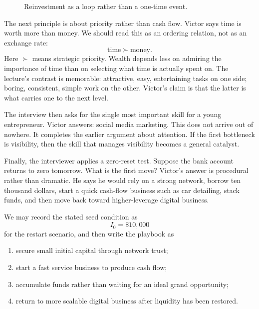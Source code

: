 \begin{figure}
\centering
{}
\caption{Reinvestment as a loop rather than a one-time event.}
\end{figure}

The next principle is about priority rather than cash flow. Victor says time is worth more than money. We should read this as an ordering relation, not as an exchange rate:
\begin{equation}
\text{time} \succ \text{money}.
\end{equation}
Here \(\succ\) means strategic priority. Wealth depends less on admiring the importance of time than on selecting what time is actually spent on. The lecture's contrast is memorable: attractive, easy, entertaining tasks on one side; boring, consistent, simple work on the other. Victor's claim is that the latter is what carries one to the next level.

The interview then asks for the single most important skill for a young entrepreneur. Victor answers: social media marketing. This does not arrive out of nowhere. It completes the earlier argument about attention. If the first bottleneck is visibility, then the skill that manages visibility becomes a general catalyst.

Finally, the interviewer applies a zero-reset test. Suppose the bank account returns to zero tomorrow. What is the first move? Victor's answer is procedural rather than dramatic. He says he would rely on a strong network, borrow ten thousand dollars, start a quick cash-flow business such as car detailing, stack funds, and then move back toward higher-leverage digital business.

We may record the stated seed condition as
\begin{equation}
I_0 = \$10{,}000
\end{equation}
for the restart scenario, and then write the playbook as
\begin{enumerate}
\item secure small initial capital through network trust;
\item start a fast service business to produce cash flow;
\item accumulate funds rather than waiting for an ideal grand opportunity;
\item return to more scalable digital business after liquidity has been restored.
\end{enumerate}

